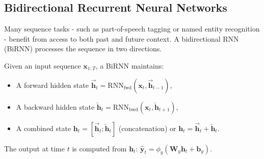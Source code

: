 \documentclass{tufte-handout}
\begin{document}
\subsection{Bidirectional Recurrent Neural Networks}

Many sequence tasks - such as part-of-speech tagging or named entity recognition - benefit from access to both past and future context. A bidirectional RNN (BiRNN) processes the sequence in two directions.

\begin{defn}
    Given an input sequence $\mathbf{x}_{1:T}$, a BiRNN maintains:
    \begin{itemize}
        \item A forward hidden state $\overrightarrow{\mathbf{h}}_t = \text{RNN}_{\text{fwd}}(\mathbf{x}_t, \overrightarrow{\mathbf{h}}_{t-1})$,
        \item A backward hidden state $\overleftarrow{\mathbf{h}}_t = \text{RNN}_{\text{bwd}}(\mathbf{x}_t, \overleftarrow{\mathbf{h}}_{t+1})$,
        \item A combined state $\mathbf{h}_t = [\overrightarrow{\mathbf{h}}_t; \overleftarrow{\mathbf{h}}_t]$ (concatenation) or $\mathbf{h}_t = \overrightarrow{\mathbf{h}}_t + \overleftarrow{\mathbf{h}}_t$.
    \end{itemize}
    The output at time $t$ is computed from $\mathbf{h}_t$: $\hat{\mathbf{y}}_t = \phi_y(\mathbf{W}_y \mathbf{h}_t + \mathbf{b}_y)$.
\end{defn}
\end{document}
